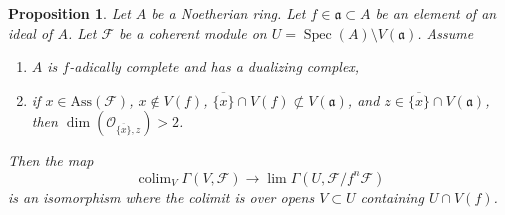 \documentclass{stacks-project}
\theoremstyle{plain}
\newtheorem{proposition}[subsection]{Proposition}
\theoremstyle{definition}
\theoremstyle{remark}
\numberwithin{equation}{subsection}
\def\lim{\mathop{\mathrm{lim}}\nolimits}
\def\colim{\mathop{\mathrm{colim}}\nolimits}
\def\Spec{\mathop{\mathrm{Spec}}}
\begin{document}
\begin{proposition}
\label{proposition-alternative-colim-H0}
Let $A$ be a Noetherian ring. Let $f \in \mathfrak a \subset A$
be an element of an ideal of $A$. Let $\mathcal{F}$ be a coherent
module on $U = \Spec(A) \setminus V(\mathfrak a)$. Assume
\begin{enumerate}
\item $A$ is $f$-adically complete and has a dualizing complex,
\item if $x \in \text{Ass}(\mathcal{F})$, $x \not \in V(f)$,
$\overline{\{x\}} \cap V(f) \not \subset V(\mathfrak a)$,
and $z \in \overline{\{x\}} \cap V(\mathfrak a)$, then
$\dim(\mathcal{O}_{\overline{\{x\}}, z}) > 2$.
\end{enumerate}
Then the map
$$
\colim_V \Gamma(V, \mathcal{F})
\longrightarrow
\lim \Gamma(U, \mathcal{F}/f^n\mathcal{F})
$$
is an isomorphism where the colimit is over opens $V \subset U$
containing $U \cap V(f)$.
\end{proposition}
\end{document}
